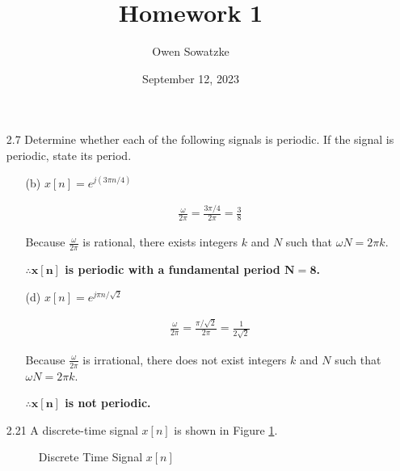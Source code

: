 \documentclass[fleqn]{article}
\title{Homework 1}
\author{Owen Sowatzke}
\date{September 12, 2023}
\begin{document}
	\setlength{\abovedisplayskip}{0pt}
	\setlength{\belowdisplayskip}{0pt}
	\setlength{\abovedisplayshortskip}{0pt}
	\setlength{\belowdisplayshortskip}{0pt}
	\setlength{\mathindent}{0pt}
	\doublespacing
	\maketitle
	
	\begin{enumerate}[nolistsep]
	
		\item[2.7] Determine whether each of the following signals is periodic. If the signal is periodic, state its period.
		
		\begin{enumerate}[nolistsep]
			
			\item[(b)] $x[n] = e^{j({3\pi}n/4)}$
			
			\begin{align*}
			\frac{\omega}{2\pi} = \frac{3\pi/4}{2\pi} = \frac{3}{8}
			\end{align*}
			
			Because $\frac{\omega}{2\pi}$ is rational, there exists integers $k$ and $N$ such that ${\omega}N = 2{\pi}k$.
			
			\textbf{$\mathbf{\therefore x[n]}$ is periodic with a fundamental period $\mathbf{N = 8}$.}
			
			\item[(d)] $x[n] = e^{j{\pi}n/\sqrt{2}}$
			
			\begin{align*}
			\frac{\omega}{2\pi} = \frac{\pi/\sqrt{2}}{2\pi} = \frac{1}{2\sqrt{2}}
			\end{align*}
			
			Because $\frac{\omega}{2\pi}$ is irrational, there does not exist integers $k$ and $N$ such that ${\omega}N = 2{\pi}k$.
			
			\textbf{$\mathbf{\therefore x[n]}$ is not periodic.}
			
		\end{enumerate}\break
		\item[2.21] A discrete-time signal $x[n]$ is shown in Figure \ref{prob_statement}.
		
		\renewcommand{\thefigure}{P2.21}	
	
		\begin{figure}[H]		\centerline{}
		\caption{Discrete Time Signal $x[n]$}
		\label{prob_statement}
		\end{figure}
		

\end{enumerate}
\end{document}

